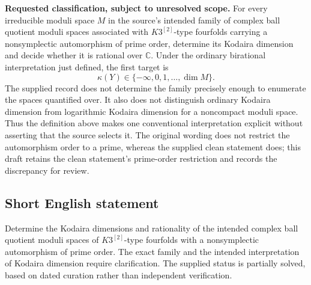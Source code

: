 \documentclass[11pt]{article}
\newcommand{\C}{\mathbb{C}}
\begin{document}
\textbf{Requested classification, subject to unresolved scope.} For every irreducible moduli space \(M\) in the source's intended family of complex ball quotient moduli spaces associated with \(K3^{[2]}\)-type fourfolds carrying a nonsymplectic automorphism of prime order, determine its Kodaira dimension and decide whether it is rational over \(\C\). Under the ordinary birational interpretation just defined, the first target is
\[
\kappa(Y)\in\{-\infty,0,1,\ldots,\dim M\}.
\]
The supplied record does not determine the family precisely enough to enumerate the spaces quantified over. It also does not distinguish ordinary Kodaira dimension from logarithmic Kodaira dimension for a noncompact moduli space. Thus the definition above makes one conventional interpretation explicit without asserting that the source selects it. The original wording does not restrict the automorphism order to a prime, whereas the supplied clean statement does; this draft retains the clean statement's prime-order restriction and records the discrepancy for review.
\subsection{Short English statement}
Determine the Kodaira dimensions and rationality of the intended complex ball quotient moduli spaces of \(K3^{[2]}\)-type fourfolds with a nonsymplectic automorphism of prime order. The exact family and the intended interpretation of Kodaira dimension require clarification. The supplied status is partially solved, based on dated curation rather than independent verification.
\end{document}
